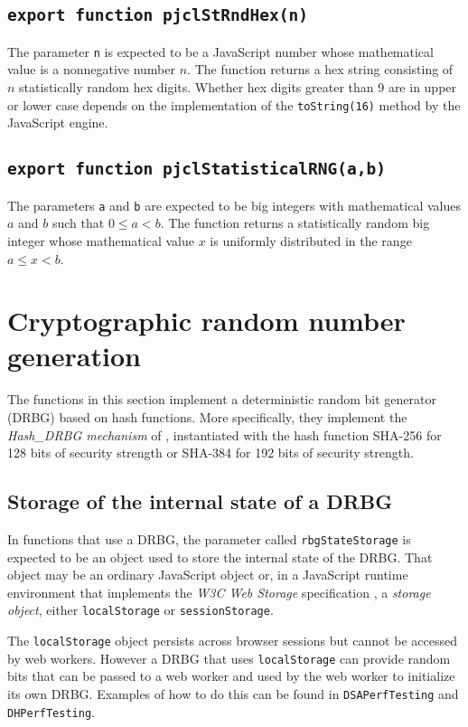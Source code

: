 \documentclass[12pt]{article}
\begin{document}
\subsection{\tt export function pjclStRndHex(n)}

The parameter {\tt n} is expected to be a JavaScript number whose
mathematical value is a nonnegative number $n$.  The function returns a
hex string consisting of $n$ statistically random hex digits.  Whether hex
digits greater than 9 are in upper or lower case depends on the
implementation of the {\tt toString(16)} method by the JavaScript
engine.

\subsection{\tt export function pjclStatisticalRNG(a,b)}

The parameters {\tt a} and {\tt b} are expected to be big integers
with mathematical values $a$ and $b$ such that $0 \leq a < b$.  The
function returns a statistically random big integer whose mathematical
value $x$ is uniformly distributed in the range $a \leq x < b$.

\section{Cryptographic random number generation}
\label{s:cryptorandom}

The functions in this section implement a deterministic random bit
generator (DRBG) based on hash functions.  More specifically, they
implement the {\em Hash\_DRBG mechanism\/} of
\cite[\S~10.1.1]{SP800-90Ar1}, instantiated with the hash function SHA-256 for
128 bits of security strength or SHA-384 for 192 bits of security
strength.  

\subsection{Storage of the internal state of a DRBG}
\label{s:rbgstate}

In functions that use a DRBG, the parameter called {\tt rbgStateStorage}
is expected to be an object used to store the internal state of the DRBG.
That object may be an ordinary JavaScript object or, in
a JavaScript runtime environment that implements the {\em W3C Web
  Storage} specification \cite{local-storage}, a {\em storage object},
either {\tt localStorage} or {\tt sessionStorage}.

The {\tt localStorage} object persists across browser sessions but 
cannot be accessed by web workers.  However a DRBG that uses 
{\tt localStorage} can provide random bits that can be passed to a web 
worker and used by the web worker to initialize its own DRBG.
Examples of how to do this can be found in 
{\tt DSAPerfTesting} and {\tt DHPerfTesting}.
\end{document}
